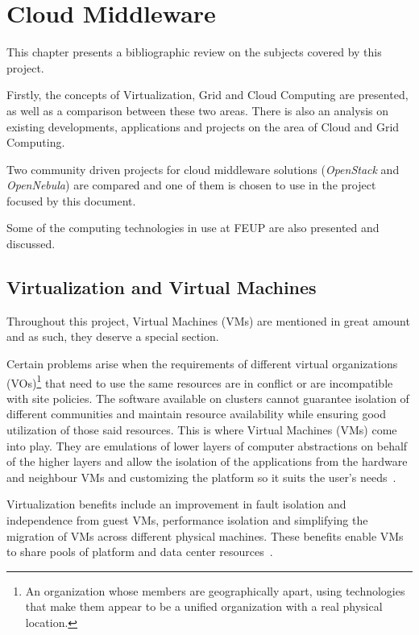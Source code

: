 \chapter{Cloud Middleware} \label{chap:sota}

This chapter presents a bibliographic review on the subjects covered by this project. 

Firstly, the concepts of Virtualization, Grid and Cloud Computing are presented, as well as a comparison between these two areas. There is also an analysis on existing developments, applications and projects on the area of Cloud and Grid Computing.

Two community driven projects for cloud middleware solutions (\textit{OpenStack} and \textit{OpenNebula}) are compared and one of them is chosen to use in the project focused by this document.

Some of the computing technologies in use at FEUP are also presented and discussed.

\section{Virtualization and Virtual Machines} \label{sec:virtualization} 

Throughout this project, Virtual Machines (VMs) are mentioned in great amount and as such, they deserve a special section.

Certain problems arise when the requirements of different virtual organizations (VOs)\footnote{An organization whose members are geographically apart, using technologies that make them appear to be a unified organization with a real physical location.} that need to use the same resources are in conflict or are incompatible with site policies. The software available on clusters cannot guarantee isolation of different communities and maintain resource availability while ensuring good utilization of those said resources. This is where Virtual Machines (VMs) come into play. They are emulations of lower layers of computer abstractions on behalf of the higher layers and allow the isolation of the applications from the hardware and neighbour VMs and customizing the platform so it suits the user's needs~\cite{clusters-grid, Zhang05virtualcluster}.

Virtualization benefits include an improvement in fault isolation and independence from guest VMs, performance isolation and simplifying the migration of VMs across different physical machines. These benefits enable VMs to share pools of platform and data center resources~\cite{virtualpower}.

